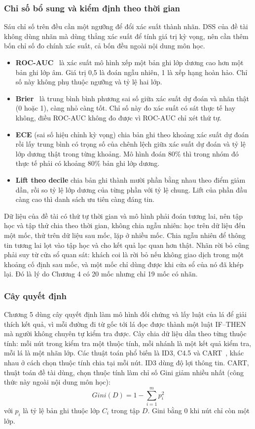 \subsubsection{Chỉ số bổ sung và kiểm định theo thời gian}\label{sec:chisobosung}
Sáu chỉ số trên đều cần một ngưỡng để đổi xác suất thành nhãn. DSS của đề tài không dùng nhãn mà dùng thẳng xác suất để tính giá trị kỳ vọng, nên cần thêm bốn chỉ số đo chính xác suất, cả bốn đều ngoài nội dung môn học.
\begin{itemize}
    \item \textbf{ROC-AUC}~\cite{fawcett2006} là xác suất mô hình xếp một bản ghi lớp dương cao hơn một bản ghi lớp âm. Giá trị 0,5 là đoán ngẫu nhiên, 1 là xếp hạng hoàn hảo. Chỉ số này không phụ thuộc ngưỡng và tỷ lệ hai lớp.
    \item \textbf{Brier}~\cite{brier1950} là trung bình bình phương sai số giữa xác suất dự đoán và nhãn thật (0 hoặc 1), càng nhỏ càng tốt. Chỉ số này đo xác suất có sát thực tế hay không, điều ROC-AUC không đo được vì ROC-AUC chỉ xét thứ tự.
    \item \textbf{ECE} (sai số hiệu chỉnh kỳ vọng) chia bản ghi theo khoảng xác suất dự đoán rồi lấy trung bình có trọng số của chênh lệch giữa xác suất dự đoán và tỷ lệ lớp dương thật trong từng khoảng. Mô hình đoán 80\% thì trong nhóm đó thực tế phải có khoảng 80\% bản ghi lớp dương.
    \item \textbf{Lift theo decile} chia bản ghi thành mười phần bằng nhau theo điểm giảm dần, rồi so tỷ lệ lớp dương của từng phần với tỷ lệ chung. Lift của phần đầu càng cao thì danh sách ưu tiên càng đáng tin.
\end{itemize}
Dữ liệu của đề tài có thứ tự thời gian và mô hình phải đoán tương lai, nên tập học và tập thử chia theo thời gian, không chia ngẫu nhiên: học trên dữ liệu đến một mốc, thử trên dữ liệu sau mốc, lặp ở nhiều mốc. Chia ngẫu nhiên để thông tin tương lai lọt vào tập học và cho kết quả lạc quan hơn thật. Nhãn rời bỏ cũng phải suy từ cửa sổ quan sát: khách coi là rời bỏ nếu không giao dịch trong một khoảng cố định sau mốc, và một mốc chỉ dùng được khi cửa sổ của nó đã khép lại. Đó là lý do Chương 4 có 20 mốc nhưng chỉ 19 mốc có nhãn.

\subsubsection{Cây quyết định}
Chương 5 dùng cây quyết định làm mô hình đối chứng và lấy luật của lá để giải thích kết quả, vì mỗi đường đi từ gốc tới lá đọc được thành một luật IF--THEN mà người không chuyên tự kiểm tra được. Cây chia dữ liệu dần theo từng thuộc tính: mỗi nút trong kiểm tra một thuộc tính, mỗi nhánh là một kết quả kiểm tra, mỗi lá là một nhãn lớp. Các thuật toán phổ biến là ID3, C4.5 và CART~\cite{han2011}, khác nhau ở cách chọn thuộc tính chia tại mỗi nút. ID3 dùng độ lợi thông tin. CART, thuật toán đề tài dùng, chọn thuộc tính làm chỉ số Gini giảm nhiều nhất (công thức này ngoài nội dung môn học):
\begin{equation}
    Gini(D) = 1 - \sum_{i=1}^{m} p_i^2
\end{equation}
với $p_i$ là tỷ lệ bản ghi thuộc lớp $C_i$ trong tập $D$. Gini bằng 0 khi nút chỉ còn một lớp.

